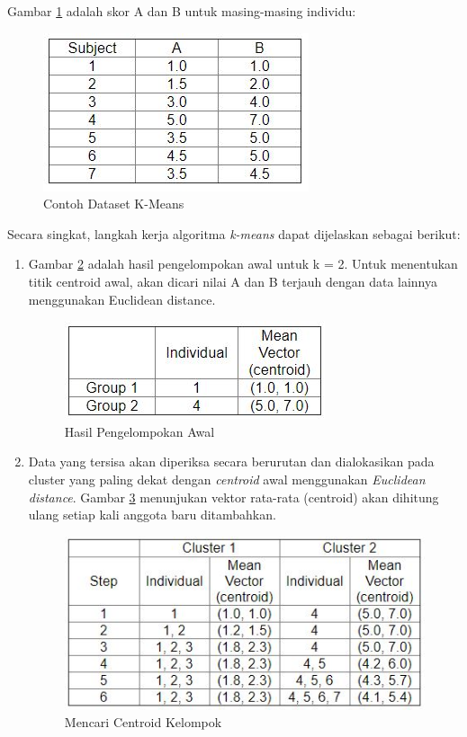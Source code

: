 \documentclass[a4paper,twoside]{article}
\begin{document}
\begin{enumerate}
\noindent Gambar \ref{fig:kmeans_1} adalah skor A dan B untuk masing-masing individu:

\begin{figure}[H]
	\centering
	\includegraphics[scale=0.9]{kmeans_1}
	\caption{Contoh Dataset K-Means}
	\label{fig:kmeans_1}
\end{figure}

\newpage
\noindent Secara singkat, langkah kerja algoritma \textit{k-means} dapat dijelaskan sebagai berikut:
\begin{enumerate}

\item Gambar \ref{fig:kmeans_2} adalah hasil pengelompokan awal untuk k = 2. Untuk menentukan titik centroid awal, akan dicari nilai A dan B terjauh dengan data lainnya menggunakan Euclidean distance.

\begin{figure}[H]
	\centering
	\includegraphics[scale=0.9]{kmeans_2}
	\caption{Hasil Pengelompokan Awal}
	\label{fig:kmeans_2}
\end{figure}

\item Data yang tersisa akan diperiksa secara berurutan dan dialokasikan pada cluster yang paling dekat dengan \textit{centroid} awal menggunakan \textit{Euclidean distance}. Gambar \ref{fig:kmeans_3} menunjukan vektor rata-rata (centroid) akan dihitung ulang setiap kali anggota baru ditambahkan.

\begin{figure}[H]
	\centering
	\includegraphics[scale=0.9]{kmeans_3}
	\caption{Mencari Centroid Kelompok}
	\label{fig:kmeans_3}
\end{figure}


\end{enumerate}
\end{enumerate}
\end{document}
